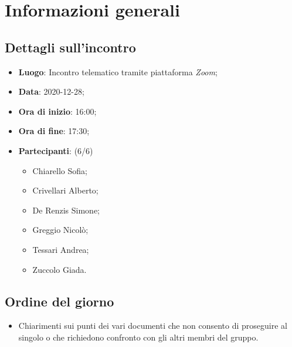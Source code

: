\section{Informazioni generali}

\subsection{Dettagli sull'incontro}
\begin{itemize}
\item \textbf{Luogo}: Incontro telematico tramite piattaforma \textit{Zoom};
\item \textbf{Data}: 2020-12-28;
\item \textbf{Ora di inizio}: 16:00;
\item \textbf{Ora di fine}: 17:30;
\item \textbf{Partecipanti}: (6/6)
\begin{itemize}
	\item Chiarello Sofia;
	\item Crivellari Alberto;
	\item De Renzis Simone;
	\item Greggio Nicolò;
	\item Tessari Andrea;
	\item Zuccolo Giada.
\end{itemize}
\end{itemize}

\subsection{Ordine del giorno}
\begin{itemize}
	\item Chiarimenti sui punti dei vari documenti che non consento di proseguire al singolo o che richiedono confronto con gli altri membri del gruppo.
\end{itemize}



